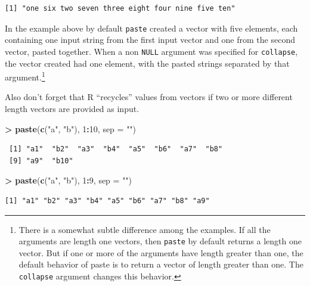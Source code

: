 \documentclass[
]{krantz}
\makeatletter
\newenvironment{Shaded}{\begin{snugshade}}{\end{snugshade}}
\newcommand{\DataTypeTok}[1]{\textcolor[rgb]{0.27,0.27,0.27}{#1}}
\newcommand{\DecValTok}[1]{\textcolor[rgb]{0.06,0.06,0.06}{#1}}
\newcommand{\KeywordTok}[1]{\textcolor[rgb]{0.27,0.27,0.27}{\textbf{#1}}}
\newcommand{\NormalTok}[1]{#1}
\newcommand{\OperatorTok}[1]{\textcolor[rgb]{0.43,0.43,0.43}{\textbf{#1}}}
\newcommand{\StringTok}[1]{\textcolor[rgb]{0.5,0.5,0.5}{#1}}
\newenvironment{kframe}{%
\medskip{}
\setlength{\fboxsep}{.8em}
 \def\at@end@of@kframe{}%
 \ifinner\ifhmode%
  \def\at@end@of@kframe{\end{minipage}}%
  \begin{minipage}{\columnwidth}%
 \fi\fi%
 \def\FrameCommand##1{\hskip\@totalleftmargin \hskip-\fboxsep
 \colorbox{shadecolor}{##1}\hskip-\fboxsep
     \hskip-\linewidth \hskip-\@totalleftmargin \hskip\columnwidth}%
 \MakeFramed {\advance\hsize-\width
   \@totalleftmargin\z@ \linewidth\hsize
   \@setminipage}}%
 {\par\unskip\endMakeFramed%
 \at@end@of@kframe}
\renewenvironment{Shaded}{\begin{kframe}}{\end{kframe}}
\makeatother
\begin{document}
\begin{verbatim}
[1] "one six two seven three eight four nine five ten"
\end{verbatim}

In the example above by default \texttt{paste} created a vector with five elements, each containing one input string from the first input vector and one from the second vector, pasted together. When a non \texttt{NULL} argument was specified for \texttt{collapse}, the vector created had one element, with the pasted strings separated by that argument.\footnote{There is a somewhat subtle difference among the examples. If all the arguments are length one vectors, then \texttt{paste} by default returns a length one vector. But if one or more of the arguments have length greater than one, the default behavior of paste is to return a vector of length greater than one. The \texttt{collapse} argument changes this behavior.}

Also don't forget that R ``recycles'' values from vectors if two or more different length vectors are provided as input.

\begin{Shaded}
\begin{Highlighting}[]
\OperatorTok{\textgreater{}}\StringTok{ }\KeywordTok{paste}\NormalTok{(}\KeywordTok{c}\NormalTok{(}\StringTok{"a"}\NormalTok{, }\StringTok{"b"}\NormalTok{), }\DecValTok{1}\OperatorTok{:}\DecValTok{10}\NormalTok{, }\DataTypeTok{sep =} \StringTok{""}\NormalTok{)}
\end{Highlighting}
\end{Shaded}

\begin{verbatim}
 [1] "a1"  "b2"  "a3"  "b4"  "a5"  "b6"  "a7"  "b8" 
 [9] "a9"  "b10"
\end{verbatim}

\begin{Shaded}
\begin{Highlighting}[]
\OperatorTok{\textgreater{}}\StringTok{ }\KeywordTok{paste}\NormalTok{(}\KeywordTok{c}\NormalTok{(}\StringTok{"a"}\NormalTok{, }\StringTok{"b"}\NormalTok{), }\DecValTok{1}\OperatorTok{:}\DecValTok{9}\NormalTok{, }\DataTypeTok{sep =} \StringTok{""}\NormalTok{)}
\end{Highlighting}
\end{Shaded}

\begin{verbatim}
[1] "a1" "b2" "a3" "b4" "a5" "b6" "a7" "b8" "a9"
\end{verbatim}
\end{document}
